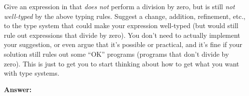 \documentclass{article}
\begin{document}
\begin{task}
  Give an expression in {\ezlang} that {\em does not} perform a division by
  zero, but is still {\em not well-typed} by the above typing rules.
  Suggest a change, addition, refinement, etc., to the type system that could
  make your expression well-typed (but would still rule out expressions that
  divide by zero).
  You don't need to actually implement your suggestion, or even argue that
  it's possible or practical, and it's fine if your solution still rules out
  some ``OK'' programs (programs that don't divide by zero).
  This is just to get you to start thinking about
  how to get what you want with type systems.
\end{task}

\textbf{Answer:}
\end{document}
